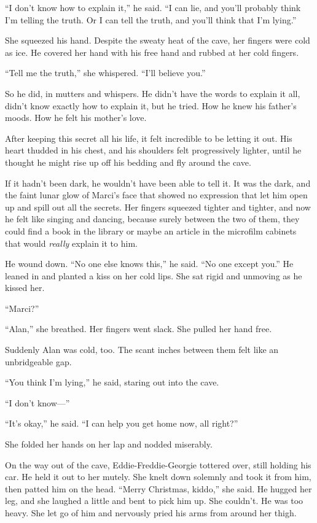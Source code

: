 ``I don't know how to explain it,'' he said.  ``I can lie, and you'll
probably think I'm telling the truth.  Or I can tell the truth, and
you'll think that I'm lying.''

She squeezed his hand.  Despite the sweaty heat of the cave, her
fingers were cold as ice.  He covered her hand with his free hand and
rubbed at her cold fingers.

``Tell me the truth,'' she whispered.  ``I'll believe you.''

So he did, in mutters and whispers.  He didn't have the words to
explain it all, didn't know exactly how to explain it, but he tried. 
How he knew his father's moods.  How he felt his mother's love.

After keeping this secret all his life, it felt incredible to be
letting it out.  His heart thudded in his chest, and his shoulders
felt progressively lighter, until he thought he might rise up off his
bedding and fly around the cave.

If it hadn't been dark, he wouldn't have been able to tell it.  It was
the dark, and the faint lunar glow of Marci's face that showed no
expression that let him open up and spill out all the secrets.  Her
fingers squeezed tighter and tighter, and now he felt like singing and
dancing, because surely between the two of them, they could find a
book in the library or maybe an article in the microfilm cabinets that
would \textit{really} explain it to him.

He wound down.  ``No one else knows this,'' he said.  ``No one except
you.'' He leaned in and planted a kiss on her cold lips.  She sat
rigid and unmoving as he kissed her.

``Marci?''

``Alan,'' she breathed.  Her fingers went slack.  She pulled her hand
free.

Suddenly Alan was cold, too.  The scant inches between them felt like
an unbridgeable gap.

``You think I'm lying,'' he said, staring out into the cave.

``I don't know---''

``It's okay,'' he said.  ``I can help you get home now, all right?''

She folded her hands on her lap and nodded miserably.

On the way out of the cave, Eddie-Freddie-Georgie tottered over, still
holding his car.  He held it out to her mutely.  She knelt down
solemnly and took it from him, then patted him on the head.  ``Merry
Christmas, kiddo,'' she said.  He hugged her leg, and she laughed a
little and bent to pick him up.  She couldn't.  He was too heavy.  She
let go of him and nervously pried his arms from around her thigh.

